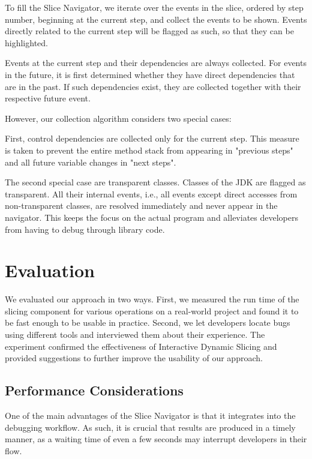 \documentclass[
			english,
			]{elsarticle}
\begin{document}
To fill the Slice Navigator, we iterate over the events in the slice, ordered by step number, beginning at the current step, and collect the events to be shown.
Events directly related to the current step will be flagged as such, so that they can be highlighted.

Events at the current step and their dependencies are always collected.
For events in the future, it is first determined whether they have direct dependencies that are in the past.
If such dependencies exist, they are collected together with their respective future event.

However, our collection algorithm considers two special cases:

First, control dependencies are collected only for the current step.
This measure is taken to prevent the entire method stack from appearing in "previous steps" and all future variable changes in "next steps".

The second special case are transparent classes.
Classes of the JDK are flagged as transparent.
All their internal events, i.e., all events except direct accesses from non-transparent classes, are resolved immediately and never appear in the navigator.
This keeps the focus on the actual program and alleviates developers from having to debug through library code.

\section{Evaluation}
\label{sec:eval}

We evaluated our approach in two ways.
First, we measured the run time of the slicing component for various operations on a real-world project and found it to be fast enough to be usable in practice.
Second, we let developers locate bugs using different tools and interviewed them about their experience.
The experiment confirmed the effectiveness of Interactive Dynamic Slicing and provided suggestions to further improve the usability of our approach.

\subsection{Performance Considerations}

One of the main advantages of the Slice Navigator is that it integrates into the debugging workflow.
As such, it is crucial that results are produced in a timely manner, as a waiting time of even a few seconds may interrupt developers in their flow.
\end{document}
